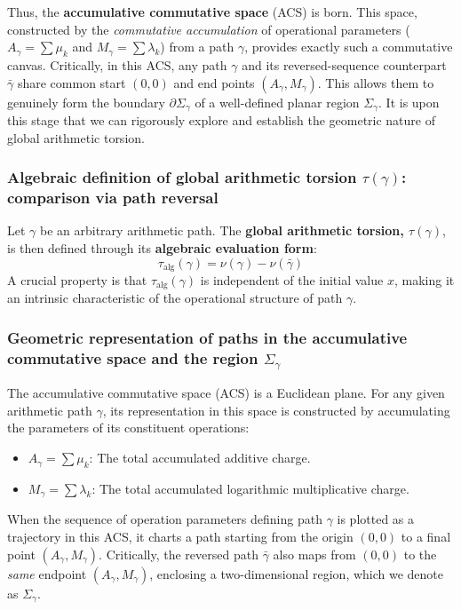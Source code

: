 \documentclass[12pt]{article}
\begin{document}
Thus, the \textbf{accumulative commutative space} (ACS) is born. This space, constructed by the \textit{commutative accumulation} of operational parameters ($A_\gamma = \sum \mu_k$ and $M_\gamma = \sum \lambda_k$) from a path $\gamma$, provides exactly such a commutative canvas. Critically, in this ACS, any path $\gamma$ and its reversed-sequence counterpart $\bar{\gamma}$ share common start $(0,0)$ and end points $(A_\gamma, M_\gamma)$. This allows them to genuinely form the boundary $\partial\Sigma_\gamma$ of a well-defined planar region $\Sigma_\gamma$. It is upon this stage that we can rigorously explore and establish the geometric nature of global arithmetic torsion.

\subsubsection*{Algebraic definition of global arithmetic torsion $\tau(\gamma)$: comparison via path reversal}

Let $\gamma$ be an arbitrary arithmetic path. The \textbf{global arithmetic torsion, $\tau(\gamma)$}, is then defined through its \textbf{algebraic evaluation form}:
\begin{equation}
\tau_{\text{alg}}(\gamma) = \nu(\gamma) - \nu(\bar{\gamma})
\label{eq:T_alg_formal_final_narrative_enhanced_acs_AM_lc}
\end{equation}
A crucial property is that $\tau_{\text{alg}}(\gamma)$ is independent of the initial value $x$, making it an intrinsic characteristic of the operational structure of path $\gamma$.

\subsubsection*{Geometric representation of paths in the accumulative commutative space and the region $\Sigma_\gamma$}

The accumulative commutative space (ACS) is a Euclidean plane. For any given arithmetic path $\gamma$, its representation in this space is constructed by accumulating the parameters of its constituent operations:
\begin{itemize}
    \item $A_\gamma = \sum \mu_k$: The total accumulated additive charge.
    \item $M_\gamma = \sum \lambda_k$: The total accumulated logarithmic multiplicative charge.
\end{itemize}
When the sequence of operation parameters defining path $\gamma$ is plotted as a trajectory in this ACS, it charts a path starting from the origin $(0,0)$ to a final point $(A_\gamma, M_\gamma)$. Critically, the reversed path $\bar{\gamma}$ also maps from $(0,0)$ to the \textit{same} endpoint $(A_\gamma, M_\gamma)$, enclosing a two-dimensional region, which we denote as $\Sigma_\gamma$.
\end{document}
